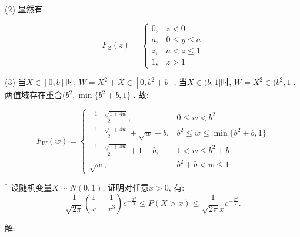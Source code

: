\documentclass[standard]{ExBook}
\begin{document}
\begin{qitems}
    \begin{bbox}
(2) 显然有:
\vspace{-2em}
\begin{center}
\begin{equation}
    F_{Z}(z)=
    \left\{
    \begin{array}{cl}
        \nonumber
        0, &z<0\\
        a, &0\leq y\leq a\\
        z, &a<z\leq 1\\
        1, &z>1
    \end{array}
    \right.
\end{equation}
\end{center}
(3) 当$X\in[0,b]$时, $W=X^2+X\in[0,b^2+b]$; 当$X\in(b,1]$时, $W=X^2\in(b^2,1]$. 两值域存在重合$(b^2,\min\{b^2+b,1\}]$. 故:
\vspace{-2em}
\begin{center}
\begin{equation}
    F_{W}(w)=
    \left\{
    \begin{array}{cl}
        \nonumber
        \displaystyle\frac{-1+\sqrt{1+4w}}{2}, &0\leq w<b^2\\
        \displaystyle\frac{-1+\sqrt{1+4w}}{2}+\sqrt{w}-b, &b^2\leq w\leq\min\{b^2+b,1\}\\
        \displaystyle\frac{-1+\sqrt{1+4w}}{2}+1-b, &1< w\leq b^2+b\\
        \sqrt{w}, &b^2+b<w\leq 1
    \end{array}
    \right.
\end{equation}
\end{center}
    \end{bbox}

\vspace{-5em}

    \begin{bbox}
    \begin{shaded}
        \qitem$^{*}$
设随机变量$X\sim N(0,1)$, 证明对任意$x > 0$, 有:
$$\frac{1}{\sqrt{2\pi}}\left(\frac{1}{x}-\frac{1}{x^3}\right)e^{-\frac{x^2}{2}} \leq P(X>x) \leq \frac{1}{\sqrt{2\pi}x}e^{-\frac{x^2}{2}}.$$
    \end{shaded}
    \end{bbox}

\vspace{-5em}

    \begin{bbox}
解: 


\end{bbox}
\end{qitems}
\end{document}

